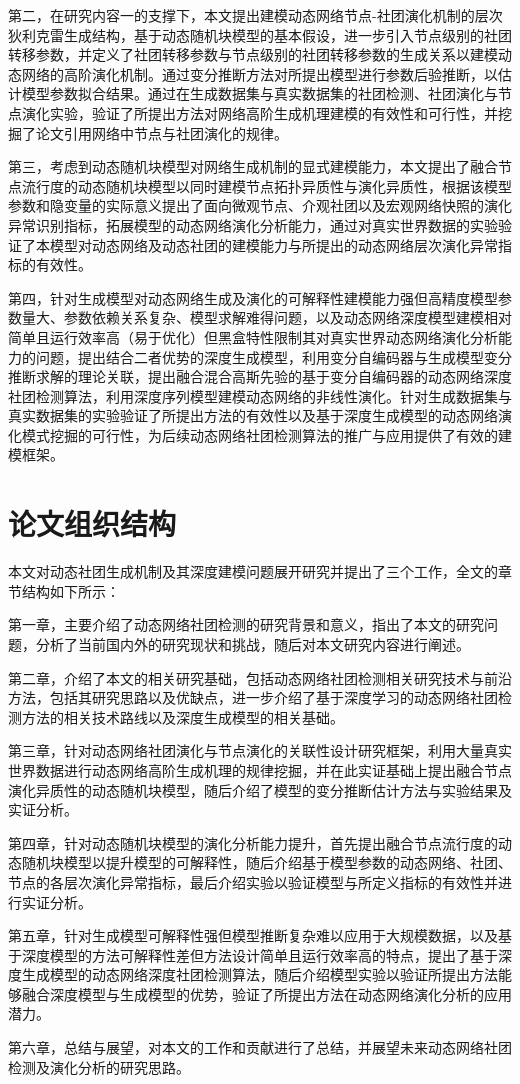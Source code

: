 第二，在研究内容一的支撑下，本文提出建模动态网络节点-社团演化机制的层次狄利克雷生成结构，基于动态随机块模型的基本假设，进一步引入节点级别的社团转移参数，并定义了社团转移参数与节点级别的社团转移参数的生成关系以建模动态网络的高阶演化机制。通过变分推断方法对所提出模型进行参数后验推断，以估计模型参数拟合结果。通过在生成数据集与真实数据集的社团检测、社团演化与节点演化实验，验证了所提出方法对网络高阶生成机理建模的有效性和可行性，并挖掘了论文引用网络中节点与社团演化的规律。

第三，考虑到动态随机块模型对网络生成机制的显式建模能力，本文提出了融合节点流行度的动态随机块模型以同时建模节点拓扑异质性与演化异质性，根据该模型参数和隐变量的实际意义提出了面向微观节点、介观社团以及宏观网络快照的演化异常识别指标，拓展模型的动态网络演化分析能力，通过对真实世界数据的实验验证了本模型对动态网络及动态社团的建模能力与所提出的动态网络层次演化异常指标的有效性。

第四，针对生成模型对动态网络生成及演化的可解释性建模能力强但高精度模型参数量大、参数依赖关系复杂、模型求解难得问题，以及动态网络深度模型建模相对简单且运行效率高（易于优化）但黑盒特性限制其对真实世界动态网络演化分析能力的问题，提出结合二者优势的深度生成模型，利用变分自编码器与生成模型变分推断求解的理论关联，提出融合混合高斯先验的基于变分自编码器的动态网络深度社团检测算法，利用深度序列模型建模动态网络的非线性演化。针对生成数据集与真实数据集的实验验证了所提出方法的有效性以及基于深度生成模型的动态网络演化模式挖掘的可行性，为后续动态网络社团检测算法的推广与应用提供了有效的建模框架。

\section{论文组织结构}
本文对动态社团生成机制及其深度建模问题展开研究并提出了三个工作，全文的章节结构如下所示：



第一章，主要介绍了动态网络社团检测的研究背景和意义，指出了本文的研究问题，分析了当前国内外的研究现状和挑战，随后对本文研究内容进行阐述。

第二章，介绍了本文的相关研究基础，包括动态网络社团检测相关研究技术与前沿方法，包括其研究思路以及优缺点，进一步介绍了基于深度学习的动态网络社团检测方法的相关技术路线以及深度生成模型的相关基础。

第三章，针对动态网络社团演化与节点演化的关联性设计研究框架，利用大量真实世界数据进行动态网络高阶生成机理的规律挖掘，并在此实证基础上提出融合节点演化异质性的动态随机块模型，随后介绍了模型的变分推断估计方法与实验结果及实证分析。

第四章，针对动态随机块模型的演化分析能力提升，首先提出融合节点流行度的动态随机块模型以提升模型的可解释性，随后介绍基于模型参数的动态网络、社团、节点的各层次演化异常指标，最后介绍实验以验证模型与所定义指标的有效性并进行实证分析。

第五章，针对生成模型可解释性强但模型推断复杂难以应用于大规模数据，以及基于深度模型的方法可解释性差但方法设计简单且运行效率高的特点，提出了基于深度生成模型的动态网络深度社团检测算法，随后介绍模型实验以验证所提出方法能够融合深度模型与生成模型的优势，验证了所提出方法在动态网络演化分析的应用潜力。

第六章，总结与展望，对本文的工作和贡献进行了总结，并展望未来动态网络社团检测及演化分析的研究思路。



